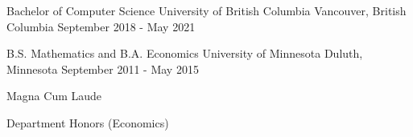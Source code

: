 

\begin{cventries}

  \cventry
    {Bachelor of Computer Science} %
    {University of British Columbia} %
    {Vancouver, British Columbia} %
    {September 2018 - May 2021} %
    {}

    
  \cventry
    {B.S. Mathematics and B.A. Economics} %
    {University of Minnesota} %
    {Duluth, Minnesota} %
    {September 2011 - May 2015} %
    {
      \begin{cvitems} %
        \item {Magna Cum Laude}
        \item {Department Honors (Economics)}
      \end{cvitems}
    }


\end{cventries}
